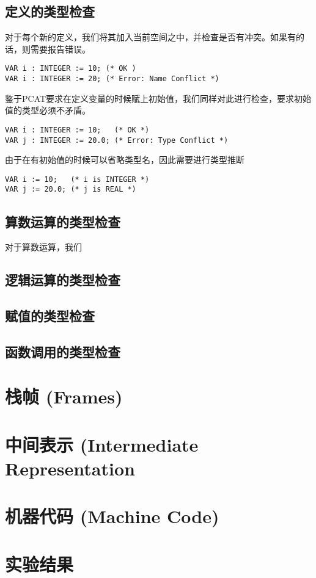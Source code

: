 ﻿\documentclass{article}
\begin{document}
\subsection{定义的类型检查}

对于每个新的定义，我们将其加入当前空间之中，并检查是否有冲突。如果有的话，则需要报告错误。
\begin{lstlisting}
VAR i : INTEGER := 10; (* OK )
VAR i : INTEGER := 20; (* Error: Name Conflict *)
\end{lstlisting}

鉴于PCAT要求在定义变量的时候赋上初始值，我们同样对此进行检查，要求初始值的类型必须不矛盾。
\begin{lstlisting}
VAR i : INTEGER := 10;   (* OK *)
VAR j : INTEGER := 20.0; (* Error: Type Conflict *)
\end{lstlisting}

由于在有初始值的时候可以省略类型名，因此需要进行类型推断
\begin{lstlisting}
VAR i := 10;   (* i is INTEGER *)
VAR j := 20.0; (* j is REAL *)
\end{lstlisting}


\subsection{算数运算的类型检查}
对于算数运算，我们


\subsection{逻辑运算的类型检查}
\subsection{赋值的类型检查}
\subsection{函数调用的类型检查}


\section{栈帧 (Frames)}

\section{中间表示 (Intermediate Representation}

\section{机器代码 (Machine Code)}

\section{实验结果}
\end{document}
